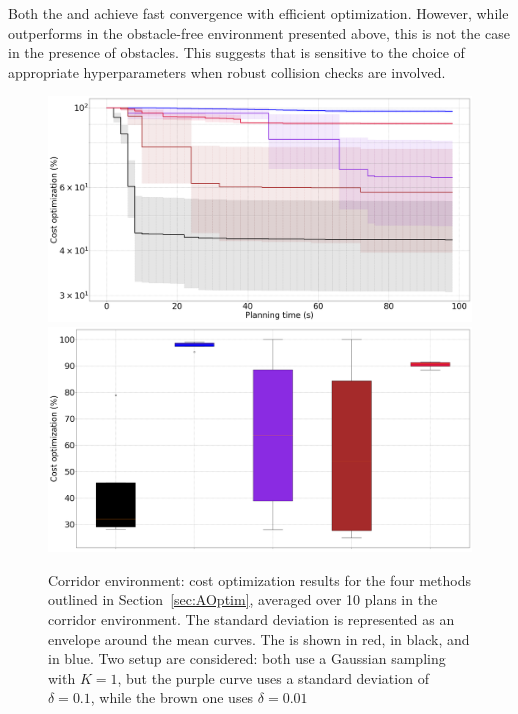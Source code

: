 Both the  and  achieve fast convergence with efficient optimization. 
However, while  outperforms  in the obstacle-free environment presented above, this is not the case in the presence of obstacles. 
This suggests that  is sensitive to the choice of appropriate hyperparameters when robust collision checks are involved.

\begin{figure} [h!]
    \centering
    \includegraphics[width=0.9\linewidth]{figures/accuracy/all_methods_corridor.png} \\
    \includegraphics[width=0.9\linewidth]{figures/accuracy/bplot_all_methods_corridor.png}
    \caption{Corridor environment: cost optimization results for the four methods outlined in Section~\ref{sec:AOptim}, averaged over 10 plans in the corridor environment. 
    The standard deviation is represented as an envelope around the mean curves.
    The  is shown in red,  in black, and  in blue.
    Two  setup are considered: both use a Gaussian sampling with $K = 1$, but the purple curve uses a standard deviation of $\delta = 0.1$, while the brown one uses $\delta = 0.01$}%
    \label{fig:acc_corridor}%
\end{figure}

